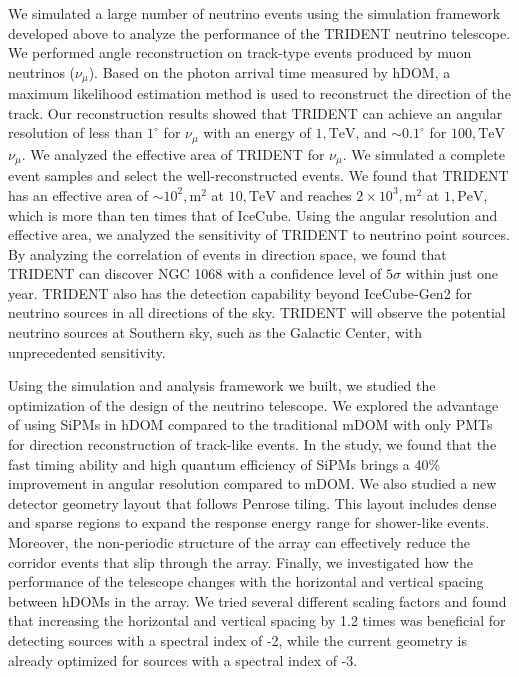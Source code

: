\begin{eabstract}
We simulated a large number of neutrino events using the simulation framework developed above to analyze the performance of the TRIDENT neutrino telescope. We performed angle reconstruction on track-type events produced by muon neutrinos ($\nu_\mu$). Based on the photon arrival time measured by hDOM, a maximum likelihood estimation method is used to reconstruct the direction of the track. Our reconstruction results showed that TRIDENT can achieve an angular resolution of less than $1^\circ$ for $\nu_\mu$ with an energy of $1,\mathrm{TeV}$, and $\sim 0.1^\circ$ for $100,\mathrm{TeV}$ $\nu_\mu$.
We analyzed the effective area of TRIDENT for $\nu_\mu$. We simulated a complete event samples and select the well-reconstructed events. We found that TRIDENT has an effective area of $\sim 10^2,\mathrm{m^2}$ at $10,\mathrm{TeV}$ and reaches $2\times 10^3,\mathrm{m^2}$ at $1,\mathrm{PeV}$, which is more than ten times that of IceCube.
Using the angular resolution and effective area, we analyzed the sensitivity of TRIDENT to neutrino point sources. By analyzing the correlation of events in direction space, we found that TRIDENT can discover NGC 1068 with a confidence level of $5\sigma$ within just one year. 
TRIDENT also has the detection capability beyond IceCube-Gen2 for neutrino sources in all directions of the sky.
TRIDENT will observe the potential neutrino sources at Southern sky, such as the Galactic Center, with unprecedented sensitivity.


Using the simulation and analysis framework we built, we studied the optimization of the design of the neutrino telescope.
We explored the advantage of using SiPMs in hDOM compared to the traditional mDOM with only PMTs for direction reconstruction of track-like events. In the study, we found that the fast timing ability and high quantum efficiency of SiPMs brings a 40\% improvement in angular resolution compared to mDOM.
We also studied a new detector geometry layout that follows Penrose tiling. This layout includes dense and sparse regions to expand the response energy range for shower-like events. Moreover, the non-periodic structure of the array can effectively reduce the corridor events that slip through the array.
Finally, we investigated how the performance of the telescope changes with the horizontal and vertical spacing between hDOMs in the array. We tried several different scaling factors and found that increasing the horizontal and vertical spacing by 1.2 times was beneficial for detecting sources with a spectral index of -2, while the current geometry is already optimized for sources with a spectral index of -3.


\end{eabstract}
